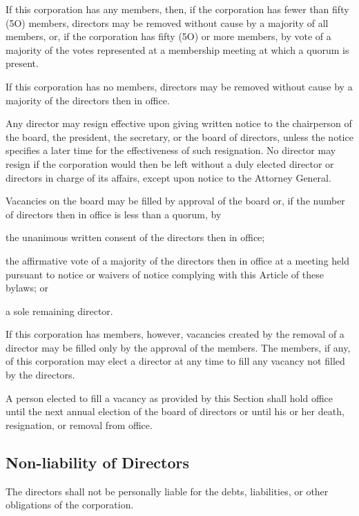\documentclass{article}
\begin{document}
	If this corporation has any members, then, if the corporation has fewer than fifty (5O) members, directors may be removed without cause by a majority of all members, or, if the corporation has fifty (5O) or more members, by vote of a majority of the votes represented at a membership meeting at which a quorum is present.
	
	If this corporation has no members, directors may be removed without cause by a majority of the directors then in office.
	
	Any director may resign effective upon giving written notice to the chairperson of the board, the president, the secretary, or the board of directors, unless the notice specifies a later time for the effectiveness of such resignation. No director may resign if the corporation would then be left without a duly elected director or directors in charge of its affairs, except upon notice to the Attorney General.
	
	Vacancies on the board may be filled by approval of the board or, if the number of directors then in office is less than a quorum, by
	\begin{inparaenum}[\itshape 1\upshape)]
		\item the unanimous written consent of the directors then in office; 
		\item the affirmative vote of a majority of the directors then in office at a meeting held pursuant to notice or waivers of notice complying with this Article of these bylaws; or 
		\item a sole remaining director. 
	\end{inparaenum}
	If this corporation has members, however, vacancies created by the removal of a director may be filled only by the approval of the members. The members, if any, of this corporation may elect a director at any time to fill any vacancy not filled by the directors.
	
	A person elected to fill a vacancy as provided by this Section shall hold office until the next annual election of the board of directors or until his or her death, resignation, or removal from office.
	
	\subsection{Non-liability of Directors}
	The directors shall not be personally liable for the debts, liabilities, or other obligations of the corporation.
	
\end{document}
